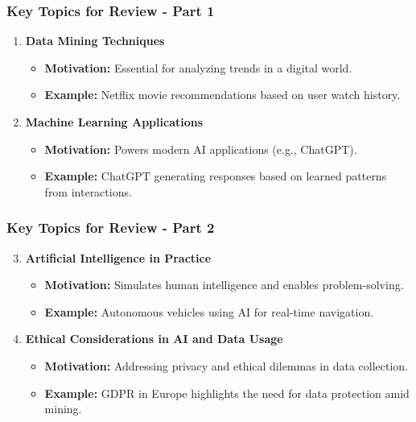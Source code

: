 \documentclass[aspectratio=169]{beamer}
\begin{document}
\begin{frame}[fragile]
    \frametitle{Key Topics for Review - Part 1}
    \begin{enumerate}
        \item \textbf{Data Mining Techniques}
        \begin{itemize}
            \item \textbf{Motivation:} Essential for analyzing trends in a digital world.
            \item \textbf{Example:} Netflix movie recommendations based on user watch history.
        \end{itemize}
        
        \item \textbf{Machine Learning Applications}
        \begin{itemize}
            \item \textbf{Motivation:} Powers modern AI applications (e.g., ChatGPT).
            \item \textbf{Example:} ChatGPT generating responses based on learned patterns from interactions.
        \end{itemize}
    \end{enumerate}
\end{frame}

\begin{frame}[fragile]
    \frametitle{Key Topics for Review - Part 2}
    \begin{enumerate}
        \setcounter{enumi}{2} %
        \item \textbf{Artificial Intelligence in Practice}
        \begin{itemize}
            \item \textbf{Motivation:} Simulates human intelligence and enables problem-solving.
            \item \textbf{Example:} Autonomous vehicles using AI for real-time navigation.
        \end{itemize}

        \item \textbf{Ethical Considerations in AI and Data Usage}
        \begin{itemize}
            \item \textbf{Motivation:} Addressing privacy and ethical dilemmas in data collection.
            \item \textbf{Example:} GDPR in Europe highlights the need for data protection amid mining.
        \end{itemize}
    \end{enumerate}
\end{frame}
\end{document}
